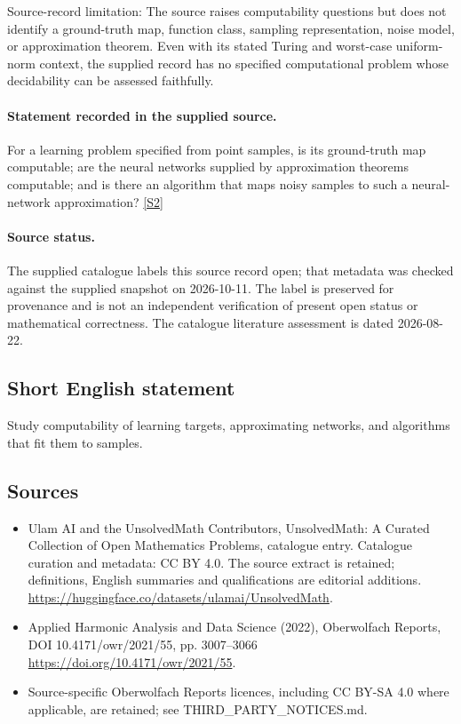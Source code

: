 \documentclass[11pt]{article}
\begin{document}
Source-record limitation: The source raises computability questions but does not identify a ground-truth map, function class, sampling representation, noise model, or approximation theorem. Even with its stated Turing and worst-case uniform-norm context, the supplied record has no specified computational problem whose decidability can be assessed faithfully.
\paragraph{Statement recorded in the supplied source.}
For a learning problem specified from point samples, is its ground-truth map computable; are the neural networks supplied by approximation theorems computable; and is there an algorithm that maps noisy samples to such a neural-network approximation? \href{https://doi.org/10.4171/owr/2021/55}{[S2]}
\paragraph{Source status.}
The supplied catalogue labels this source record open; that metadata was checked against the supplied snapshot on 2026-10-11. The label is preserved for provenance and is not an independent verification of present open status or mathematical correctness. The catalogue literature assessment is dated 2026-08-22.
\subsection{Short English statement}
Study computability of learning targets, approximating networks, and algorithms that fit them to samples.
\subsection{Sources}
\begin{itemize}
\item[S1] Ulam AI and the UnsolvedMath Contributors, UnsolvedMath: A Curated Collection of Open Mathematics Problems, catalogue entry. Catalogue curation and metadata: CC BY 4.0. The source extract is retained; definitions, English summaries and qualifications are editorial additions.
\url{https://huggingface.co/datasets/ulamai/UnsolvedMath}.
\item[S2] Applied Harmonic Analysis and Data Science (2022), Oberwolfach Reports, DOI 10.4171/owr/2021/55, pp. 3007--3066
\url{https://doi.org/10.4171/owr/2021/55}.
\item Source-specific Oberwolfach Reports licences, including CC BY-SA 4.0 where applicable, are retained; see THIRD\_PARTY\_NOTICES.md.
\end{itemize}
\end{document}

